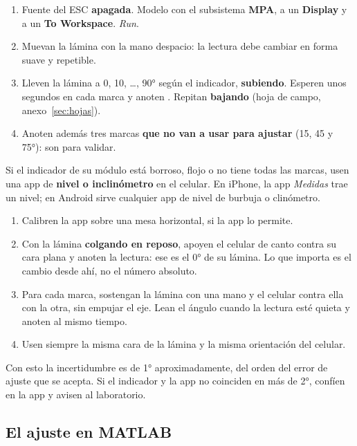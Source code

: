 \documentclass[11pt,letterpaper]{article}
\newcommand{\blq}[1]{\textsf{\textbf{#1}}}                 %
\newcommand{\sen}[1]{\texttt{\detokenize{#1}}}             %
\begin{document}
\begin{pasos}[Procedimiento]
\begin{enumerate}[leftmargin=14pt]
  \item Fuente del ESC \textbf{apagada}. Modelo con el subsistema \blq{MPA}, \sen{adc} a un \blq{Display} y a un \blq{To Workspace}. \emph{Run}.
  \item Muevan la lámina con la mano despacio: la lectura debe cambiar en forma suave y repetible.
  \item Lleven la lámina a 0, 10, \dots, 90° según el indicador, \textbf{subiendo}. Esperen unos segundos en cada marca y anoten \sen{adc}. Repitan \textbf{bajando} (hoja de campo, anexo~\ref{sec:hojas}).
  \item Anoten además tres marcas \textbf{que no van a usar para ajustar} (15, 45 y 75°): son para validar.
\end{enumerate}
\end{pasos}

\begin{nota}
Si el indicador de su módulo está borroso, flojo o no tiene todas las marcas, usen una app de \textbf{nivel o inclinómetro} en el celular. En iPhone, la app \emph{Medidas} trae un nivel; en Android sirve cualquier app de nivel de burbuja o clinómetro.
\begin{enumerate}[leftmargin=14pt]
  \item Calibren la app sobre una mesa horizontal, si la app lo permite.
  \item Con la lámina \textbf{colgando en reposo}, apoyen el celular de canto contra su cara plana y anoten la lectura: ese es el 0° de su lámina. Lo que importa es el cambio desde ahí, no el número absoluto.
  \item Para cada marca, sostengan la lámina con una mano y el celular contra ella con la otra, sin empujar el eje. Lean el ángulo cuando la lectura esté quieta y anoten \sen{adc} al mismo tiempo.
  \item Usen siempre la misma cara de la lámina y la misma orientación del celular.
\end{enumerate}
Con esto la incertidumbre es de 1° aproximadamente, del orden del error de ajuste que se acepta. Si el indicador y la app no coinciden en más de 2°, confíen en la app y avisen al laboratorio.
\end{nota}

\subsection{El ajuste en MATLAB}
\end{document}
